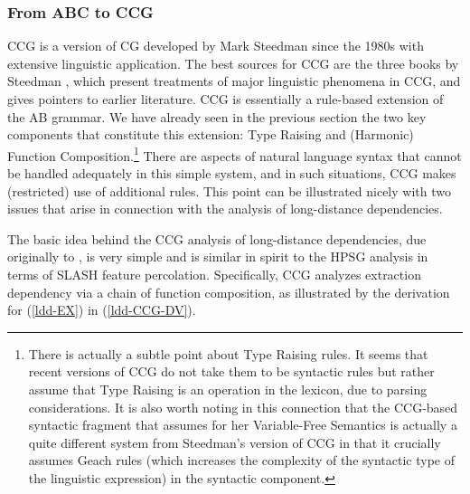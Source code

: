 \documentclass[output=paper]{langsci/langscibook}
\begin{document}
\subsubsection{From ABC to CCG }

CCG is a version of CG developed by Mark Steedman since the 1980s with
extensive linguistic application. The best sources for CCG are the
three books by Steedman \citep{Steedman97a,Steedman2000a-u,steedman2012},
which present treatments of major linguistic phenomena in CCG, and
gives pointers to earlier literature. CCG is essentially a rule-based
extension of the AB grammar. We have already seen in the previous
section the two key components that constitute this extension: Type
Raising and (Harmonic) Function Composition.\footnote{There is
actually a subtle point about Type Raising rules. It seems that recent
versions of CCG \citep{steedman2012} do not take them to be syntactic rules
but rather assume that Type Raising is an operation in the lexicon,
due to parsing considerations. It is also worth noting in this
connection that the CCG-based syntactic fragment that
\citet{jacobson1999a,jacobson2000a} assumes for her Variable-Free Semantics
is actually a quite different system from Steedman's version of CCG in
that it crucially assumes Geach rules (which increases the complexity
of the syntactic type of the linguistic expression) in the syntactic
component.} There are aspects of natural language syntax that cannot
be handled adequately in this simple system, and in such situations,
CCG makes (restricted) use of additional rules. This point can be
illustrated nicely with two issues that arise in connection with the
analysis of long-distance dependencies.

The basic idea behind the CCG analysis of long-distance dependencies,
due originally to \citet{AS82a}, is very simple and is similar in spirit to
the HPSG analysis in terms of SLASH feature percolation. Specifically,
CCG analyzes extraction dependency via a chain of function
composition, as illustrated by the derivation for (\ref{ldd-EX}) in (\ref{ldd-CCG-DV}).
\end{document}

